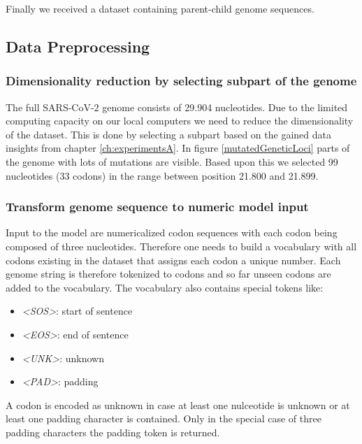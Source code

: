 Finally we received a dataset containing parent-child genome sequences.

\subsection{Data Preprocessing}  \label{ch:approachB}

\subsubsection{Dimensionality reduction by selecting subpart of the genome}
\label{ch:approachBa}

The full \ac{SARS-CoV-2} genome consists of 29.904 nucleotides. Due to the limited computing capacity on our local computers we need to reduce the dimensionality of the dataset. This is done by selecting a subpart based on the gained data insights from chapter \ref{ch:experimentsA}. In figure \ref{mutatedGeneticLoci} parts of the genome with lots of mutations are visible. Based upon this we selected 99 nucleotides (33 codons) in the range between position 21.800 and 21.899.

\subsubsection{Transform genome sequence to numeric model input}
\label{ch:approachBb}

Input to the model are numericalized codon sequences with each codon being composed of three nucleotides. Therefore one needs to build a vocabulary with all codons existing in the dataset that assigns each codon a unique number. Each genome string is therefore tokenized to codons and so far unseen codons are added to the vocabulary. The vocabulary also contains special tokens like:

\begin{itemize}
	\item \textit{<SOS>}: start of sentence
	\item \textit{<EOS>}: end of sentence
	\item \textit{<UNK>}: unknown
	\item \textit{<PAD>}: padding
\end{itemize}

A codon is encoded as unknown in case at least one nulceotide is unknown or at least one padding character is contained. Only in the special case of three padding characters the padding token is returned. 

